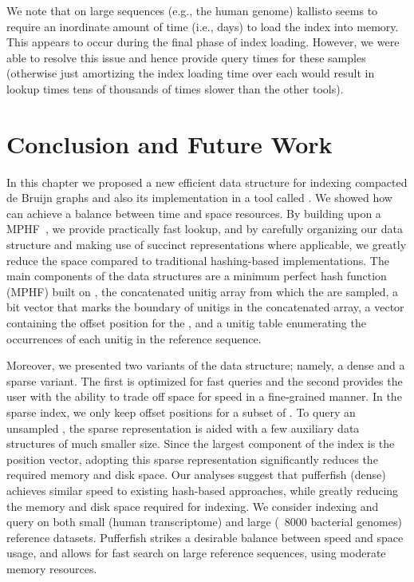 We note that on large sequences (e.g., the human genome)
kallisto seems to require an inordinate amount of time (i.e., days) to load the index into memory. This appears to
occur during the final phase of index loading. However, we were able to resolve this issue and hence
provide \kmer query times for these samples (otherwise just amortizing the index loading time over each \kmer would result
in lookup times tens of thousands of times slower than the other tools).

\section{Conclusion and Future Work}
In this chapter we proposed a new efficient data structure for indexing compacted de Bruijn graphs and also its implementation in a tool called \pufferfish. We showed how \pufferfish can achieve a balance between time and space resources. By building upon a MPHF~\cite{limasset2017fast}, we provide practically fast \kmer lookup, and by carefully organizing our data structure and making use of succinct representations where applicable, we greatly reduce the space compared to traditional hashing-based implementations. The main components of the data structures are a minimum perfect hash function (MPHF) built on \kmers, the concatenated unitig array from which the \kmers are sampled, a bit vector that marks the boundary of unitigs in the concatenated array, a vector containing the offset position for the \kmers, and a unitig table enumerating the occurrences of each unitig in the reference sequence.

Moreover, we presented two variants of the \pufferfish data structure; namely, a dense and a sparse variant. The first is optimized for fast queries and the second provides the user with the ability to trade off space for speed in a fine-grained manner. In the sparse index, we only keep offset positions for a subset of \kmers. To query an unsampled \kmer, the sparse representation is aided with a few auxiliary data structures of much smaller size. Since the largest component of the index is the position vector, adopting this sparse representation significantly reduces the required memory and disk space. Our analyses suggest that pufferfish (dense) achieves similar speed to existing hash-based approaches, while greatly reducing the memory and disk space required for indexing. We consider indexing and query on both small (human transcriptome) and large (~8000 bacterial genomes) reference datasets. Pufferfish strikes a desirable balance between speed and space usage, and allows for fast search on large reference sequences, using moderate memory resources. 

